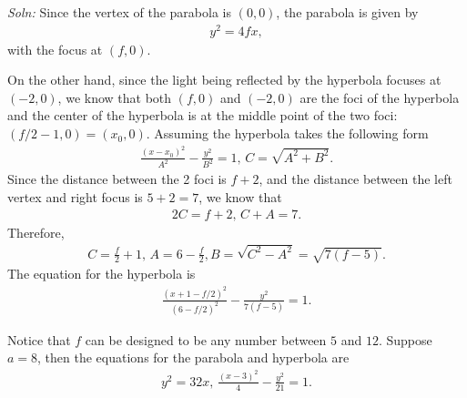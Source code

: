 \documentclass{article}
\begin{document}
\begin{enumerate}
\begin{figure}[ht]
  \end{figure}

  \emph{Soln:} Since the vertex of the parabola is $(0,0)$, the parabola is given by
  \begin{align*}
    y^2 = 4fx,
  \end{align*}
  with the focus at $(f,0)$.

  On the other hand, since the light being reflected by the hyperbola focuses at $(-2,0)$, we know that both $(f,0)$ and $(-2,0)$ are the foci of the hyperbola and the center of the hyperbola is at the middle point of the two foci: $(f/2-1,0)=(x_0,0)$. Assuming the hyperbola takes the following form
  \begin{align*}
    \frac{(x-x_0)^2}{A^2} - \frac{y^2}{B^2} = 1,\, C =\sqrt{A^2+B^2}.
  \end{align*}
  Since the distance between the 2 foci is $f + 2$, and the distance between the left vertex and right focus is $5+2 = 7$, we know that
  \begin{align*}
    2C = f+2,\,C+A = 7.
  \end{align*}
  Therefore,
  \begin{align*}
    C = \frac{f}{2}+1,\,A = 6-\frac{f}{2}, B = \sqrt{C^2-A^2} = \sqrt{7(f-5)}.
  \end{align*}
  The equation for the hyperbola is
  \begin{align*}
    \frac{(x+1-f/2)^2}{(6-f/2)^2} - \frac{y^2}{7(f-5)} = 1.
  \end{align*}

  Notice that $f$ can be designed to be any number between $5$ and $12$. Suppose $a = 8$, then the equations for the parabola and hyperbola are
\begin{align*}
  y^2 = 32x,\, \frac{(x-3)^2}{4} - \frac{y^2}{21} = 1.
\end{align*}

\end{enumerate}
\end{document}

